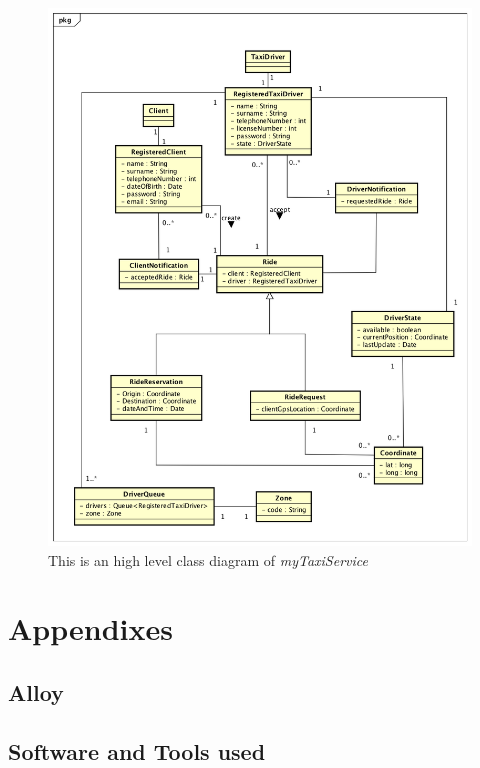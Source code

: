 \documentclass[a4paper]{article}
\begin{document}
\begin{enumerate}[label=\bfseries G\arabic*:]
\begin{figure}[H]
\includegraphics[width=\sequenceWidth]{ClassDiagramMyTaxiService}
\centering
\caption[UML Class Diagram]{This is an high level class diagram of \emph{myTaxiService}}
\label{fig:classdiagram}
\end{figure}

\section{Appendixes}

\subsection{Alloy}

\subsection{Software and Tools used}


\end{enumerate}
\end{document}
